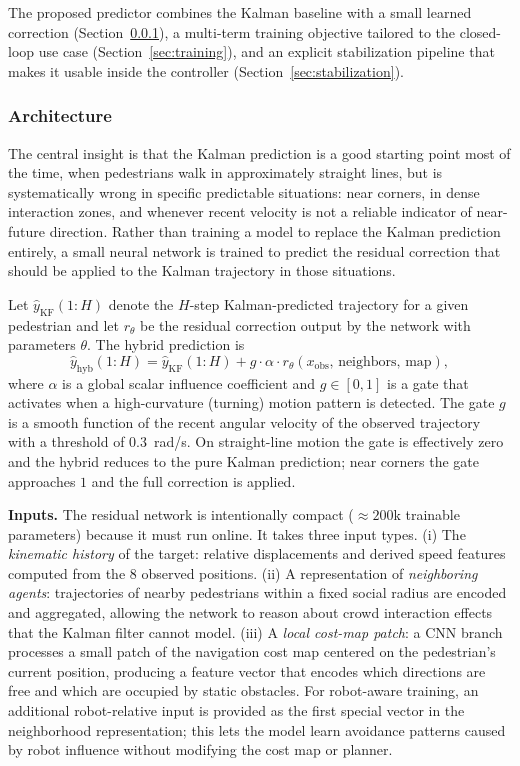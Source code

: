 \documentclass[12pt, a4paper]{article}
\begin{document}
The proposed predictor combines the Kalman baseline with a small learned correction (Section~\ref{sec:residual}), a multi-term training objective tailored to the closed-loop use case (Section~\ref{sec:training}), and an explicit stabilization pipeline that makes it usable inside the controller (Section~\ref{sec:stabilization}).

\subsubsection{Architecture}
\label{sec:residual}

The central insight is that the Kalman prediction is a good starting point most of the time, when pedestrians walk in approximately straight lines, but is systematically wrong in specific predictable situations: near corners, in dense interaction zones, and whenever recent velocity is not a reliable indicator of near-future direction. Rather than training a model to replace the Kalman prediction entirely, a small neural network is trained to predict the residual correction that should be applied to the Kalman trajectory in those situations.

Let $\hat{y}_{\text{KF}}(1{:}H)$ denote the $H$-step Kalman-predicted trajectory for a given pedestrian and let $r_\theta$ be the residual correction output by the network with parameters $\theta$. The hybrid prediction is
\begin{equation}
\hat{y}_{\text{hyb}}(1{:}H) = \hat{y}_{\text{KF}}(1{:}H) + g\cdot\alpha\cdot r_\theta(x_{\text{obs}},\,\text{neighbors},\,\text{map}),
\label{eq:hybrid}
\end{equation}
where $\alpha$ is a global scalar influence coefficient and $g\in[0,1]$ is a gate that activates when a high-curvature (turning) motion pattern is detected. The gate $g$ is a smooth function of the recent angular velocity of the observed trajectory with a threshold of $0.3$~rad/s. On straight-line motion the gate is effectively zero and the hybrid reduces to the pure Kalman prediction; near corners the gate approaches $1$ and the full correction is applied.

\textbf{Inputs.} The residual network is intentionally compact ($\approx 200$k trainable parameters) because it must run online. It takes three input types. (i) The \emph{kinematic history} of the target: relative displacements and derived speed features computed from the $8$ observed positions. (ii) A representation of \emph{neighboring agents}: trajectories of nearby pedestrians within a fixed social radius are encoded and aggregated, allowing the network to reason about crowd interaction effects that the Kalman filter cannot model. (iii) A \emph{local cost-map patch}: a CNN branch processes a small patch of the navigation cost map centered on the pedestrian's current position, producing a feature vector that encodes which directions are free and which are occupied by static obstacles. For robot-aware training, an additional robot-relative input is provided as the first special vector in the neighborhood representation; this lets the model learn avoidance patterns caused by robot influence without modifying the cost map or planner.
\end{document}

